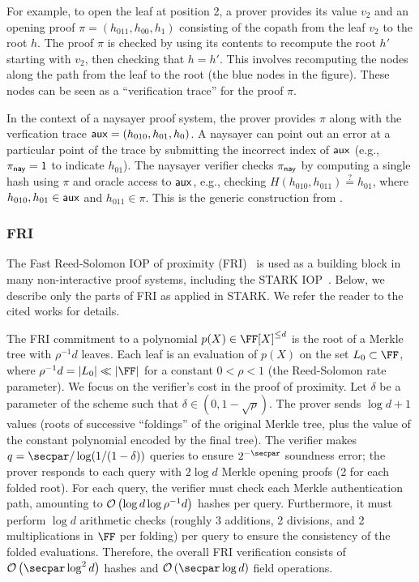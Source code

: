 For example, to open the leaf at position 2, a prover provides its value $v_2$ and an opening proof $\pi = (h_{011}, h_{00}, h_{1})$ consisting of the copath from the leaf $v_2$ to the root $h$. The proof $\pi$ is checked by using its contents to recompute the root $h'$ starting with $v_2$, then checking that $h = h'$. This involves recomputing the nodes along the path from the leaf to the root (the blue nodes in the figure). These nodes can be seen as a ``verification trace'' for the proof $\pi$.
    
In the context of a naysayer proof system, the prover provides $\pi$ along with the verfication trace $\mathsf{aux} = (h_{010}, h_{01}, h_{0})$. A naysayer can point out an error at a particular point of the trace by submitting the incorrect index of $\mathsf{aux}$ (e.g., $\pi_{\mathsf{nay}} = 1$ to indicate $h_{01}$). The naysayer verifier checks $\pi_{\mathsf{nay}}$ by computing a single hash using $\pi$ and oracle access to $\mathsf{aux}$, e.g., checking $H(h_{010}, h_{011}) \stackrel{?}{=} h_{01}$, where $h_{010}, h_{01} \in \mathsf{aux}$ and $h_{011} \in \pi$. This is the generic construction from .

\subsubsection{FRI}\label{sec:fri_naysayer}

The Fast Reed-Solomon IOP of proximity (FRI)~\cite{ICALP:BBHR18} is used as a building block in many non-interactive proof systems, including the STARK IOP~\cite{EPRINT:BBHR18}.
Below, we describe only the parts of FRI as applied in STARK. We refer the reader to the cited works for details.

The FRI commitment to a polynomial $p(X)\in\FF[X]^{\leq d}$ is the root of a Merkle tree with $\rho^{-1}d$ leaves. 
Each leaf is an evaluation of $p(X)$ on the set $L_0 \subset \FF$, where $\rho^{-1}d=\sizeof{L_0} \ll \sizeof{\FF}$ for a constant $0<\rho<1$ (the Reed-Solomon rate parameter). We focus on the verifier's cost in the proof of proximity. Let $\delta$ be a parameter of the scheme such that $\delta\in(0,1-\sqrt{\rho})$. The prover sends $\log{d}+1$ values (roots of successive ``foldings'' of the original Merkle tree, plus the value of the constant polynomial encoded by the final tree). The verifier makes $q=\secpar/\log(1/(1-\delta))$ queries to ensure $2^{-\secpar}$ soundness error; the prover responds to each query with $2\log{d}$ Merkle opening proofs (2 for each folded root). For each query, the verifier must check each Merkle authentication path, amounting to $\mathcal{O}\left(\log{d}\log{\rho^{-1}d}\right)$ hashes per query. Furthermore, it must perform $\log{d}$ arithmetic checks (roughly 3 additions, 2 divisions, and 2 multiplications in $\FF$ per folding) per query to ensure the consistency of the folded evaluations. Therefore, the overall FRI verification consists of $\bigO{\secpar\log^2{d}}$ hashes and $\bigO{\secpar\log{d}}$ field operations.

